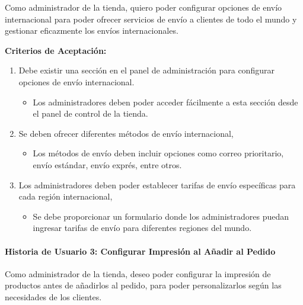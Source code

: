 \documentclass[12pt]{article}
\newcommand{\subsubsubsection}[1]{\paragraph{#1}}
\begin{document}
Como administrador de la tienda,
quiero poder configurar opciones de envío internacional
para poder ofrecer servicios de envío a clientes de todo el mundo y gestionar eficazmente los envíos internacionales.

\vspace{0.5cm}
\textbf{Criterios de Aceptación:}
\begin{enumerate}[label=\arabic*.]
    \item Debe existir una sección en el panel de administración para configurar opciones de envío internacional.
          \begin{itemize}[label=--]
              \item Los administradores deben poder acceder fácilmente a esta sección desde el panel de control de la tienda.
          \end{itemize}
    \item Se deben ofrecer diferentes métodos de envío internacional,
          \begin{itemize}[label=--]
              \item Los métodos de envío deben incluir opciones como correo prioritario, envío estándar, envío exprés, entre otros.
          \end{itemize}
    \item Los administradores deben poder establecer tarifas de envío específicas para cada región internacional,
          \begin{itemize}[label=--]
              \item Se debe proporcionar un formulario donde los administradores puedan ingresar tarifas de envío para diferentes regiones del mundo.
          \end{itemize}
\end{enumerate}


\subsubsubsection{Historia de Usuario 3: Configurar Impresión al Añadir al Pedido}\label{sec:historia3}

Como administrador de la tienda, deseo poder configurar la impresión de productos antes de añadirlos al pedido, para poder personalizarlos según las necesidades de los clientes.
\end{document}
